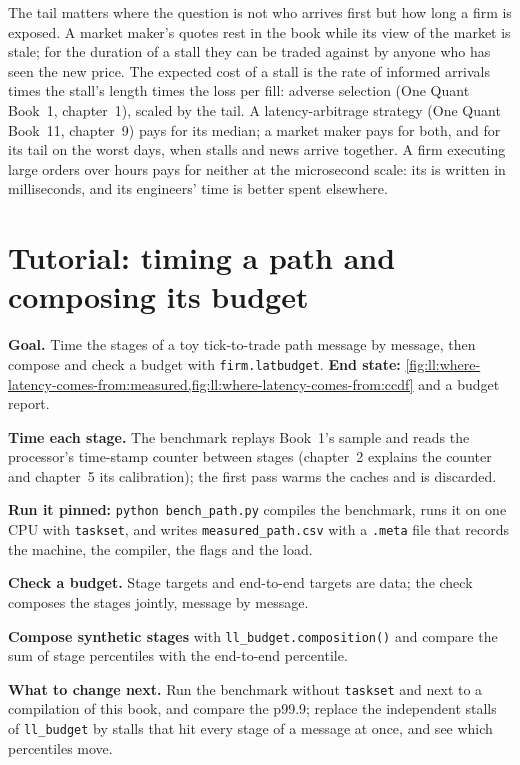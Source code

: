 The tail matters where the question is not who arrives first but how long a firm is exposed. A market maker's
quotes rest in the book while its view of the market is stale; for the duration of a stall they can be traded
against by anyone who has seen the new price. The expected cost of a stall is the rate of informed arrivals times
the stall's length times the loss per fill: adverse selection (One Quant Book~1, chapter~1), scaled by the tail. A
latency-arbitrage strategy (One Quant Book~11, chapter~9) pays for its median; a market maker pays for both, and
for its tail on the worst days, when stalls and news arrive together. A firm executing large orders over hours pays
for neither at the microsecond scale: its  is written in milliseconds, and its engineers' time is
better spent elsewhere.

\section{Tutorial: timing a path and composing its budget}\label{tut:ll:where-latency-comes-from:tut}

\begin{tutorial}
\textbf{Goal.} Time the stages of a toy tick-to-trade path message by message, then compose and check a budget with
\texttt{firm.latbudget}. \textbf{End state:} \cref{fig:ll:where-latency-comes-from:measured,fig:ll:where-latency-comes-from:ccdf}
and a budget report.
\begin{tutsteps}
\item \textbf{Time each stage.} The benchmark replays Book~1's sample and reads the processor's time-stamp counter
between stages (chapter~2 explains the counter and chapter~5 its calibration); the first pass warms the caches and is
discarded.
\label{lst:ll:where-latency-comes-from:bench}
\item \textbf{Run it pinned:} \texttt{python bench\_path.py} compiles the benchmark, runs it on one CPU with
\texttt{taskset}, and writes \texttt{measured\_path.csv} with a \texttt{.meta} file that records the machine, the
compiler, the flags and the load.
\item \textbf{Check a budget.} Stage targets and end-to-end targets are data; the check composes the stages jointly,
message by message.
\label{lst:ll:where-latency-comes-from:check}
\item \textbf{Compose synthetic stages} with \texttt{ll\_budget.composition()} and compare the sum of stage percentiles
with the end-to-end percentile.
\end{tutsteps}
\textbf{What to change next.} Run the benchmark without \texttt{taskset} and next to a compilation of this book, and
compare the p99.9; replace the independent stalls of \texttt{ll\_budget} by stalls that hit every stage of a message at
once, and see which percentiles move.
\end{tutorial}

